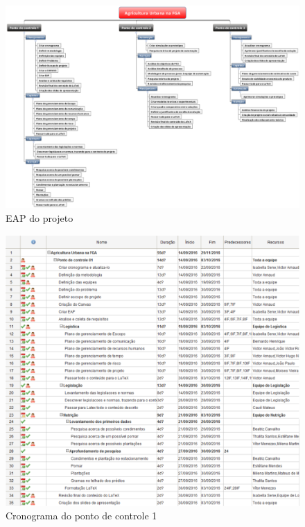 \begin{anexosenv}
  \begin{figure}[!htb]
    \label{eap}
    \centering
    \includegraphics[width=17cm, keepaspectratio=true]{figuras/tempo/eap.eps}
    \caption{EAP do projeto}
  \end{figure}

  \begin{figure}[!htb]
    \centering
    \includegraphics[width=15cm, keepaspectratio=true]{figuras/tempo/cronograma1.eps}
    \caption{Cronograma do ponto de controle 1}
  \end{figure}


\end{anexosenv}
